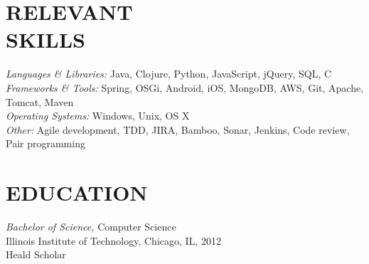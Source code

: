 \documentclass[margin]{res}
\begin{document}
\begin{resume}
\section{RELEVANT \\ SKILLS}
{\sl Languages \& Libraries:} Java, Clojure, Python, JavaScript, jQuery, SQL, C \\
{\sl Frameworks \& Tools:} Spring, OSGi, Android, iOS, MongoDB, AWS, Git, Apache, Tomcat, Maven \\
{\sl Operating Systems:} Windows, Unix, OS X \\
{\sl Other:} Agile development, TDD, JIRA, Bamboo, Sonar, Jenkins, Code review, Pair programming

\section{EDUCATION} {\sl Bachelor of Science,} Computer Science \\
                Illinois Institute of Technology, Chicago, IL,
                2012 \\
                Heald Scholar \\


\end{resume}
\end{document}
